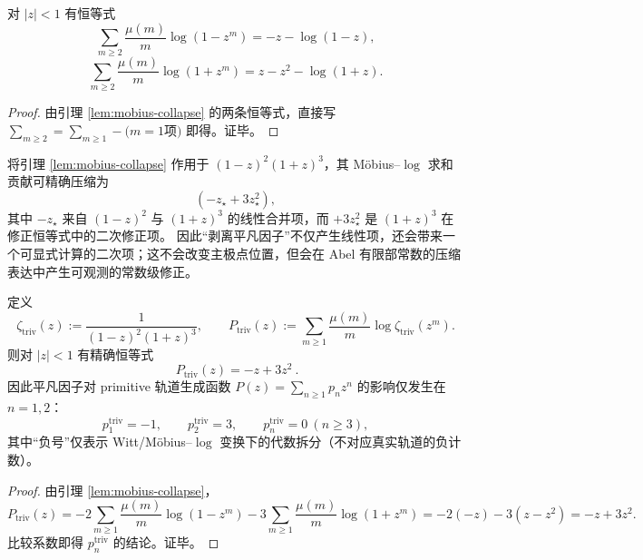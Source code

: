 \begin{lemma}[从 \texorpdfstring{$m\ge 2$}{m>=2} 开始的显式求和]\label{lem:mobius-collapse-mge2}
对 $|z|<1$ 有恒等式
\[
\sum_{m\ge 2}\frac{\mu(m)}{m}\log(1-z^m)=-z-\log(1-z),
\]
\[
\sum_{m\ge 2}\frac{\mu(m)}{m}\log(1+z^m)=z-z^2-\log(1+z).
\]
\end{lemma}
\begin{proof}
由引理 \ref{lem:mobius-collapse} 的两条恒等式，直接写
\(
\sum_{m\ge 2}=\sum_{m\ge 1}-\text{(}m=1\text{项)}
\)
即得。证毕。
\end{proof}

\begin{remark}[剥离平凡因子后的非平凡部分]
将引理 \ref{lem:mobius-collapse} 作用于 $(1-z)^2(1+z)^3$，其 Möbius--$\log$ 求和贡献可精确压缩为
\[
(-z_\star+3z_\star^2),
\]
其中 $-z_\star$ 来自 $(1-z)^2$ 与 $(1+z)^3$ 的线性合并项，而 $+3z_\star^2$ 是 $(1+z)^3$ 在修正恒等式中的二次修正项。
因此“剥离平凡因子”不仅产生线性项，还会带来一个可显式计算的二次项；这不会改变主极点位置，但会在 Abel 有限部常数的压缩表达中产生可观测的常数级修正。
\end{remark}

\begin{proposition}\label{prop:triv-factor-primitive-polynomial}
定义
\[
\zeta_{\mathrm{triv}}(z):=\frac{1}{(1-z)^2(1+z)^3},
\qquad
P_{\mathrm{triv}}(z):=\sum_{m\ge 1}\frac{\mu(m)}{m}\log\zeta_{\mathrm{triv}}(z^m).
\]
则对 \(|z|<1\) 有精确恒等式
\[
\boxed{\ P_{\mathrm{triv}}(z)=-z+3z^2\ }.
\]
因此平凡因子对 primitive 轨道生成函数 \(P(z)=\sum_{n\ge 1}p_n z^n\) 的影响仅发生在 \(n=1,2\)：
\[
p^{\mathrm{triv}}_1=-1,\qquad p^{\mathrm{triv}}_2=3,\qquad p^{\mathrm{triv}}_n=0\ (n\ge 3),
\]
其中“负号”仅表示 Witt/Möbius--$\log$ 变换下的代数拆分（不对应真实轨道的负计数）。
\end{proposition}
\begin{proof}
由引理 \ref{lem:mobius-collapse}，
\[
P_{\mathrm{triv}}(z)
=-2\sum_{m\ge 1}\frac{\mu(m)}{m}\log(1-z^m)-3\sum_{m\ge 1}\frac{\mu(m)}{m}\log(1+z^m)
=-2(-z)-3(z-z^2)=-z+3z^2.
\]
比较系数即得 \(p^{\mathrm{triv}}_n\) 的结论。证毕。
\end{proof}

